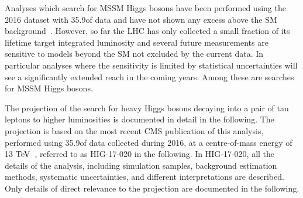 %
Analyses which search for MSSM Higgs bosons have been performed using the 2016 dataset with 35.9\fbinv of data and have not shown any excess above the 
SM background~\cite{HIG-18-014,HIG-16-018,HIG-17-020}.
However, so far the LHC has only collected a small fraction of its lifetime target integrated luminosity and
several future measurements are sensitive to models beyond the SM not excluded by the current data. In particular 
analyses where the sensitivity is limited by statistical uncertainties will see a significantly extended reach in the 
coming years. Among these are searches for MSSM Higgs bosons.

The projection of the search for heavy Higgs bosons decaying into a pair of tau leptons to higher
luminosities is documented in detail in the following. The projection is based on the most recent CMS 
publication of this analysis, performed using 35.9\fbinv of data collected during 2016, at a centre-of-mass
energy of 13$~\text{TeV}$~\cite{HIG-17-020}, referred to as HIG-17-020 in the following. 
In HIG-17-020, all the details of the analysis, including simulation samples, background estimation methods,
systematic uncertainties, and different interpretations are described. 
Only details of direct relevance to the projection are documented in the following.

